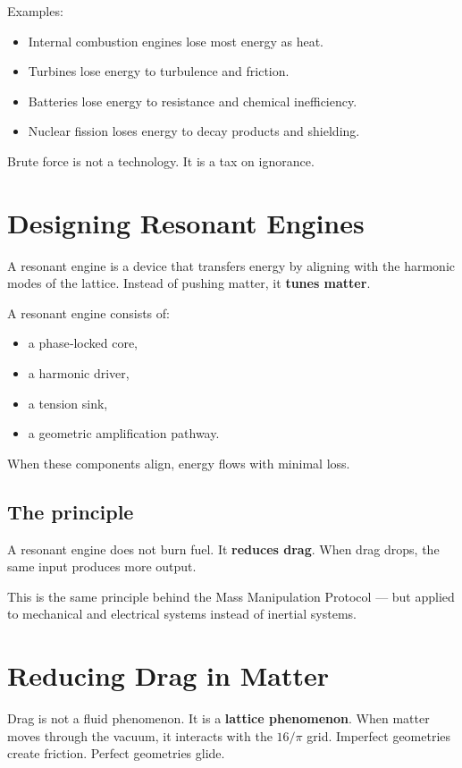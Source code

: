 \documentclass[11pt, letterpaper, openany]{book}
\begin{document}
Examples:

\begin{itemize}
    \item Internal combustion engines lose most energy as heat.
    \item Turbines lose energy to turbulence and friction.
    \item Batteries lose energy to resistance and chemical inefficiency.
    \item Nuclear fission loses energy to decay products and shielding.
\end{itemize}

Brute force is not a technology.  
It is a tax on ignorance.

\section{Designing Resonant Engines}

A resonant engine is a device that transfers energy by aligning with the harmonic modes
of the lattice. Instead of pushing matter, it \textbf{tunes matter}.

A resonant engine consists of:

\begin{itemize}
    \item a phase‑locked core,
    \item a harmonic driver,
    \item a tension sink,
    \item a geometric amplification pathway.
\end{itemize}

When these components align, energy flows with minimal loss.

\subsection*{The principle}

A resonant engine does not burn fuel.  
It \textbf{reduces drag}.  
When drag drops, the same input produces more output.

This is the same principle behind the Mass Manipulation Protocol — but applied to
mechanical and electrical systems instead of inertial systems.

\section{Reducing Drag in Matter}

Drag is not a fluid phenomenon. It is a \textbf{lattice phenomenon}. When matter moves
through the vacuum, it interacts with the $16/\pi$ grid. Imperfect geometries create
friction. Perfect geometries glide.
\end{document}
